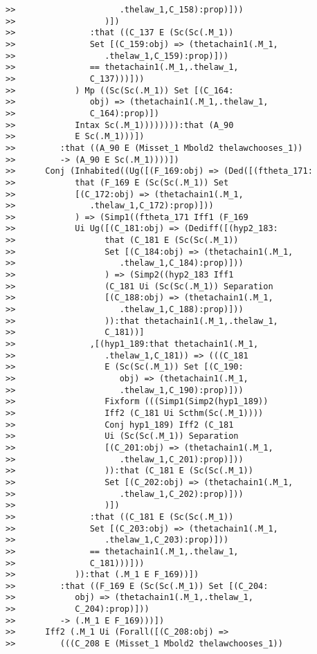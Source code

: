 \documentclass[12pt]{article}
\begin{document}
\begin{verbatim}
>>                     .thelaw_1,C_158):prop)]))
>>                  )])
>>               :that ((C_137 E (Sc(Sc(.M_1))
>>               Set [(C_159:obj) => (thetachain1(.M_1,
>>                  .thelaw_1,C_159):prop)]))
>>               == thetachain1(.M_1,.thelaw_1,
>>               C_137)))]))
>>            ) Mp ((Sc(Sc(.M_1)) Set [(C_164:
>>               obj) => (thetachain1(.M_1,.thelaw_1,
>>               C_164):prop)])
>>            Intax Sc(.M_1)))))))):that (A_90
>>            E Sc(.M_1)))])
>>         :that ((A_90 E (Misset_1 Mbold2 thelawchooses_1))
>>         -> (A_90 E Sc(.M_1))))])
>>      Conj (Inhabited((Ug([(F_169:obj) => (Ded([(ftheta_171:
>>            that (F_169 E (Sc(Sc(.M_1)) Set
>>            [(C_172:obj) => (thetachain1(.M_1,
>>               .thelaw_1,C_172):prop)]))
>>            ) => (Simp1((ftheta_171 Iff1 (F_169
>>            Ui Ug([(C_181:obj) => (Dediff([(hyp2_183:
>>                  that (C_181 E (Sc(Sc(.M_1))
>>                  Set [(C_184:obj) => (thetachain1(.M_1,
>>                     .thelaw_1,C_184):prop)]))
>>                  ) => (Simp2((hyp2_183 Iff1
>>                  (C_181 Ui (Sc(Sc(.M_1)) Separation
>>                  [(C_188:obj) => (thetachain1(.M_1,
>>                     .thelaw_1,C_188):prop)]))
>>                  )):that thetachain1(.M_1,.thelaw_1,
>>                  C_181))]
>>               ,[(hyp1_189:that thetachain1(.M_1,
>>                  .thelaw_1,C_181)) => (((C_181
>>                  E (Sc(Sc(.M_1)) Set [(C_190:
>>                     obj) => (thetachain1(.M_1,
>>                     .thelaw_1,C_190):prop)]))
>>                  Fixform (((Simp1(Simp2(hyp1_189))
>>                  Iff2 (C_181 Ui Scthm(Sc(.M_1))))
>>                  Conj hyp1_189) Iff2 (C_181
>>                  Ui (Sc(Sc(.M_1)) Separation
>>                  [(C_201:obj) => (thetachain1(.M_1,
>>                     .thelaw_1,C_201):prop)]))
>>                  )):that (C_181 E (Sc(Sc(.M_1))
>>                  Set [(C_202:obj) => (thetachain1(.M_1,
>>                     .thelaw_1,C_202):prop)]))
>>                  )])
>>               :that ((C_181 E (Sc(Sc(.M_1))
>>               Set [(C_203:obj) => (thetachain1(.M_1,
>>                  .thelaw_1,C_203):prop)]))
>>               == thetachain1(.M_1,.thelaw_1,
>>               C_181)))]))
>>            )):that (.M_1 E F_169))])
>>         :that ((F_169 E (Sc(Sc(.M_1)) Set [(C_204:
>>            obj) => (thetachain1(.M_1,.thelaw_1,
>>            C_204):prop)]))
>>         -> (.M_1 E F_169)))])
>>      Iff2 (.M_1 Ui (Forall([(C_208:obj) =>
>>         (((C_208 E (Misset_1 Mbold2 thelawchooses_1))

\end{verbatim}
\end{document}
